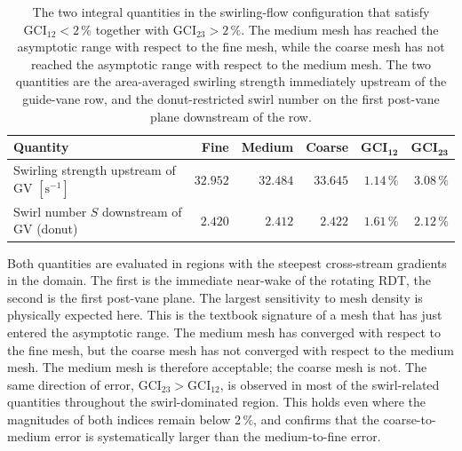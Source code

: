 \begin{table}[h!]
  \centering
  \caption[GCI -- swirling-flow configuration: quantities exceeding the $2\,\%$ threshold]{The two integral quantities in the swirling-flow configuration that satisfy $\mathrm{GCI}_{12} < 2\,\%$ together with $\mathrm{GCI}_{23} > 2\,\%$. The medium mesh has reached the asymptotic range with respect to the fine mesh, while the coarse mesh has not reached the asymptotic range with respect to the medium mesh. The two quantities are the area-averaged swirling strength immediately upstream of the guide-vane row, and the donut-restricted swirl number on the first post-vane plane downstream of the row.}
  \label{tab:gci_swirl_keep}
  \small
  \begin{tabular}{l r r r r r}
    \toprule
    \textbf{Quantity}                                            & \textbf{Fine}  & \textbf{Medium} & \textbf{Coarse} & $\mathbf{GCI_{12}}$ & $\mathbf{GCI_{23}}$ \\
    \midrule
    Swirling strength upstream of GV $[\mathrm{s}^{-1}]$         & $32.952$       & $32.484$        & $33.645$        & $1.14\,\%$ & $\mathbf{3.08\,\%}$ \\
    Swirl number $S$ downstream of GV (donut)                    & $2.420$        & $2.412$         & $2.422$         & $1.61\,\%$ & $\mathbf{2.12\,\%}$ \\
    \bottomrule
  \end{tabular}
\end{table}

Both quantities are evaluated in regions with the steepest cross-stream gradients in the domain. The first is the immediate near-wake of the rotating RDT, the second is the first post-vane plane. The largest sensitivity to mesh density is physically expected here. This is the textbook signature of a mesh that has just entered the asymptotic range. The medium mesh has converged with respect to the fine mesh, but the coarse mesh has not converged with respect to the medium mesh. The medium mesh is therefore acceptable; the coarse mesh is not. The same direction of error, $\mathrm{GCI}_{23} > \mathrm{GCI}_{12}$, is observed in most of the swirl-related quantities throughout the swirl-dominated region. This holds even where the magnitudes of both indices remain below $2\,\%$, and confirms that the coarse-to-medium error is systematically larger than the medium-to-fine error.

